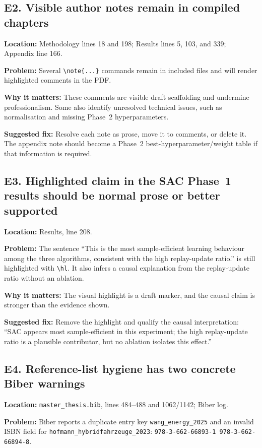 \documentclass[11pt,a4paper]{article}
\newcommand{\loc}[1]{\textbf{Location:} #1\par}
\newcommand{\problem}{\textbf{Problem:} }
\newcommand{\why}{\textbf{Why it matters:} }
\newcommand{\fix}{\textbf{Suggested fix:} }
\begin{document}
\subsection*{E2. Visible author notes remain in compiled chapters}

\loc{Methodology lines 18 and 198; Results lines 5, 103, and 339; Appendix line 166.}
\problem Several \texttt{\textbackslash note\{...\}} commands remain in included files and will render highlighted comments in the PDF.

\why These comments are visible draft scaffolding and undermine professionalism. Some also identify unresolved technical issues, such as normalisation and missing Phase~2 hyperparameters.

\fix Resolve each note as prose, move it to comments, or delete it. The appendix note should become a Phase~2 best-hyperparameter/weight table if that information is required.

\subsection*{E3. Highlighted claim in the SAC Phase~1 results should be normal prose or better supported}

\loc{Results, line 208.}
\problem The sentence ``This is the most sample-efficient learning behaviour among the three algorithms, consistent with the high replay-update ratio.'' is still highlighted with \texttt{\textbackslash hl}. It also infers a causal explanation from the replay-update ratio without an ablation.

\why The visual highlight is a draft marker, and the causal claim is stronger than the evidence shown.

\fix Remove the highlight and qualify the causal interpretation: ``SAC appears most sample-efficient in this experiment; the high replay-update ratio is a plausible contributor, but no ablation isolates this effect.''

\subsection*{E4. Reference-list hygiene has two concrete Biber warnings}

\loc{\texttt{master\_thesis.bib}, lines 484--488 and 1062/1142; Biber log.}
\problem Biber reports a duplicate entry key \texttt{wang\_energy\_2025} and an invalid ISBN field for \texttt{hofmann\_hybridfahrzeuge\_2023}: \texttt{978-3-662-66893-1 978-3-662-66894-8}.
\end{document}
